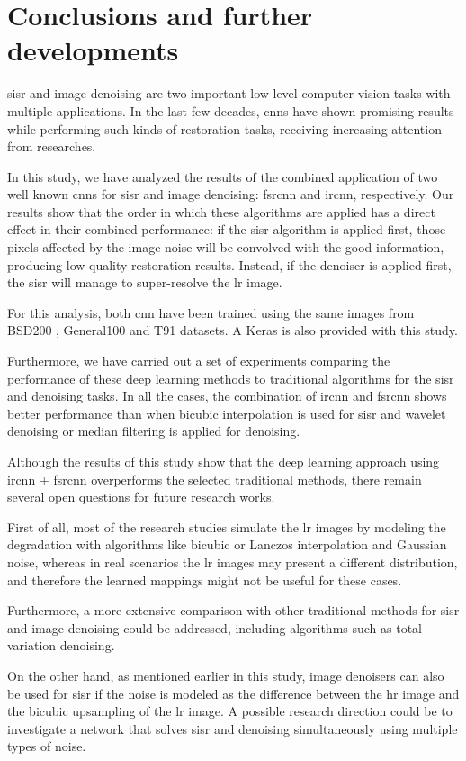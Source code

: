 \section{Conclusions and further developments} \label{sec:conclusions}

\gls{sisr} and image denoising are two important low-level computer vision tasks with multiple applications. In the last few decades, \glspl{cnn} have shown promising results while performing such kinds of restoration tasks, receiving increasing attention from researches.

In this study, we have analyzed the results of the combined application of two well known \glspl{cnn} for \gls{sisr} and image denoising: \gls{fsrcnn} and \gls{ircnn}, respectively.
Our results show that the order in which these algorithms are applied has a direct effect in their combined performance: if the \gls{sisr} algorithm is applied first, those pixels affected by the image noise will be convolved with the good information, producing low quality restoration results. Instead, if the denoiser is applied first, the \gls{sisr} will manage to super-resolve the \gls{lr} image.

For this analysis, both \gls{cnn} have been trained using the same images from BSD200 \cite{BSDS}, General100 \cite{FSRCNN} and T91 \cite{T91} datasets. A Keras \cite{KERAS} is also provided with this study.

Furthermore, we have carried out a set of experiments comparing the performance of these deep learning methods to traditional algorithms for the \gls{sisr} and denoising tasks. In all the cases, the combination of \gls{ircnn} and \gls{fsrcnn} shows better performance than when bicubic interpolation is used for \gls{sisr} and wavelet denoising or median filtering is applied for denoising.

Although the results of this study show that the deep learning approach using \gls{ircnn} + \gls{fsrcnn} overperforms the selected traditional methods, there remain several open questions for future research works.

First of all, most of the research studies simulate the \gls{lr} images by modeling the degradation with algorithms like bicubic or Lanczos interpolation and Gaussian noise, whereas in real scenarios the \gls{lr} images may present a different distribution, and therefore the learned mappings might not be useful for these cases.

Furthermore, a more extensive comparison with other traditional methods for \gls{sisr} and image denoising could be addressed, including algorithms such as total variation denoising.

On the other hand, as mentioned earlier in this study, image denoisers can also be used for \gls{sisr} if the noise is modeled as the difference between the \gls{hr} image and the bicubic upsampling
of the \gls{lr} image. A possible research direction could be to investigate a network that solves \gls{sisr} and denoising simultaneously using multiple types of noise.
